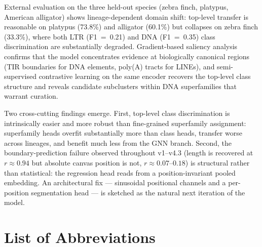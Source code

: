 \documentclass[12pt]{article}
\begin{document}
External evaluation on the three held-out species (zebra finch, platypus, American alligator) shows lineage-dependent domain shift: top-level transfer is reasonable on platypus (73.8\%) and alligator (60.1\%) but collapses on zebra finch (33.3\%), where both LTR (F1~=~0.21) and DNA (F1~=~0.35) class discrimination are substantially degraded. Gradient-based saliency analysis confirms that the model concentrates evidence at biologically canonical regions (TIR boundaries for DNA elements, poly(A) tracts for LINEs), and semi-supervised contrastive learning on the same encoder recovers the top-level class structure and reveals candidate subclusters within DNA superfamilies that warrant curation.

Two cross-cutting findings emerge. First, top-level class discrimination is intrinsically easier and more robust than fine-grained superfamily assignment: superfamily heads overfit substantially more than class heads, transfer worse across lineages, and benefit much less from the GNN branch. Second, the boundary-prediction failure observed throughout v1--v4.3 (length is recovered at $r \approx 0.94$ but absolute canvas position is not, $r \approx 0.07$--$0.18$) is structural rather than statistical: the regression head reads from a position-invariant pooled embedding. An architectural fix --- sinusoidal positional channels and a per-position segmentation head --- is sketched as the natural next iteration of the model.

\newpage
\tableofcontents

\newpage
\section*{List of Abbreviations}
\end{document}
